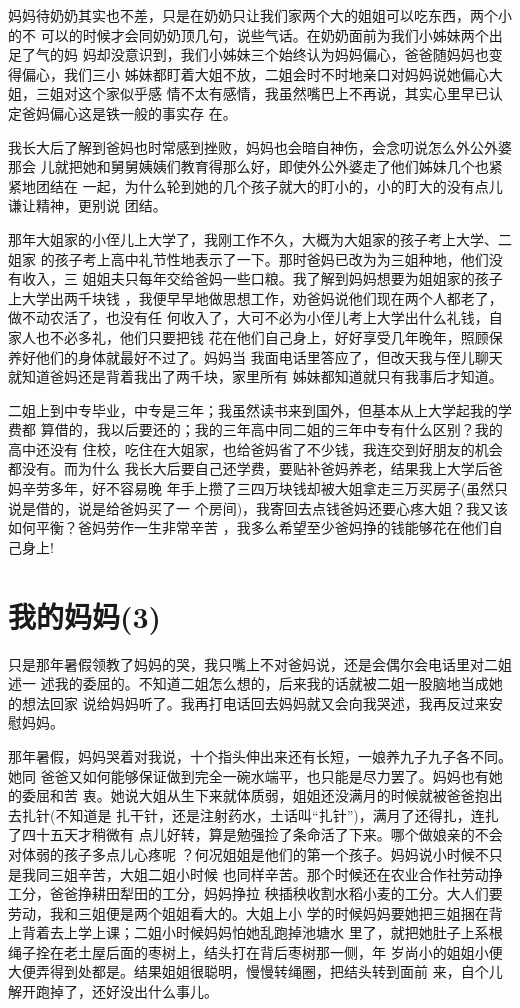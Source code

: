 \documentclass[12pt]{book}
\begin{document}
妈妈待奶奶其实也不差，只是在奶奶只让我们家两个大的姐姐可以吃东西，两个小的不
可以的时候才会同奶奶顶几句，说些气话。在奶奶面前为我们小姊妹两个出足了气的妈
妈却没意识到，我们小姊妹三个始终认为妈妈偏心，爸爸随妈妈也变得偏心，我们三小
姊妹都盯着大姐不放，二姐会时不时地亲口对妈妈说她偏心大姐，三姐对这个家似乎感
情不太有感情，我虽然嘴巴上不再说，其实心里早已认定爸妈偏心这是铁一般的事实存
在。

我长大后了解到爸妈也时常感到挫败，妈妈也会暗自神伤，会念叨说怎么外公外婆那会
儿就把她和舅舅姨姨们教育得那么好，即使外公外婆走了他们姊妹几个也紧紧地团结在
一起，为什么轮到她的几个孩子就大的盯小的，小的盯大的没有点儿谦让精神，更别说
团结。

那年大姐家的小侄儿上大学了，我刚工作不久，大概为大姐家的孩子考上大学、二姐家
的孩子考上高中礼节性地表示了一下。那时爸妈已改为为三姐种地，他们没有收入，三
姐姐夫只每年交给爸妈一些口粮。我了解到妈妈想要为姐姐家的孩子上大学出两千块钱
，我便早早地做思想工作，劝爸妈说他们现在两个人都老了，做不动农活了，也没有任
何收入了，大可不必为小侄儿考上大学出什么礼钱，自家人也不必多礼，他们只要把钱
花在他们自己身上，好好享受几年晚年，照顾保养好他们的身体就最好不过了。妈妈当
我面电话里答应了，但改天我与侄儿聊天就知道爸妈还是背着我出了两千块，家里所有
姊妹都知道就只有我事后才知道。

二姐上到中专毕业，中专是三年；我虽然读书来到国外，但基本从上大学起我的学费都
算借的，我以后要还的；我的三年高中同二姐的三年中专有什么区别？我的高中还没有
住校，吃住在大姐家，也给爸妈省了不少钱，我连交到好朋友的机会都没有。而为什么
我长大后要自己还学费，要贴补爸妈养老，结果我上大学后爸妈辛劳多年，好不容易晚
年手上攒了三四万块钱却被大姐拿走三万买房子(虽然只说是借的，说是给爸妈买了一
个房间)，我寄回去点钱爸妈还要心疼大姐？我又该如何平衡？爸妈劳作一生非常辛苦
，我多么希望至少爸妈挣的钱能够花在他们自己身上!
\section{我的妈妈(3)}
\label{sec-9-54}

只是那年暑假领教了妈妈的哭，我只嘴上不对爸妈说，还是会偶尔会电话里对二姐述一
述我的委屈的。不知道二姐怎么想的，后来我的话就被二姐一股脑地当成她的想法回家
说给妈妈听了。我再打电话回去妈妈就又会向我哭述，我再反过来安慰妈妈。

那年暑假，妈妈哭着对我说，十个指头伸出来还有长短，一娘养九子九子各不同。她同
爸爸又如何能够保证做到完全一碗水端平，也只能是尽力罢了。妈妈也有她的委屈和苦
衷。她说大姐从生下来就体质弱，姐姐还没满月的时候就被爸爸抱出去扎针(不知道是
扎干针，还是注射药水，土话叫“扎针”)，满月了还得扎，连扎了四十五天才稍微有
点儿好转，算是勉强捡了条命活了下来。哪个做娘亲的不会对体弱的孩子多点儿心疼呢
？何况姐姐是他们的第一个孩子。妈妈说小时候不只是我同三姐辛苦，大姐二姐小时候
也同样辛苦。那个时候还在农业合作社劳动挣工分，爸爸挣耕田犁田的工分，妈妈挣拉
秧插秧收割水稻小麦的工分。大人们要劳动，我和三姐便是两个姐姐看大的。大姐上小
学的时候妈妈要她把三姐捆在背上背着去上学上课；二姐小时候妈妈怕她乱跑掉池塘水
里了，就把她肚子上系根绳子拴在老土屋后面的枣树上，结头打在背后枣树那一侧，年
岁尚小的姐姐小便大便弄得到处都是。结果姐姐很聪明，慢慢转绳圈，把结头转到面前
来，自个儿解开跑掉了，还好没出什么事儿。
\end{document}
